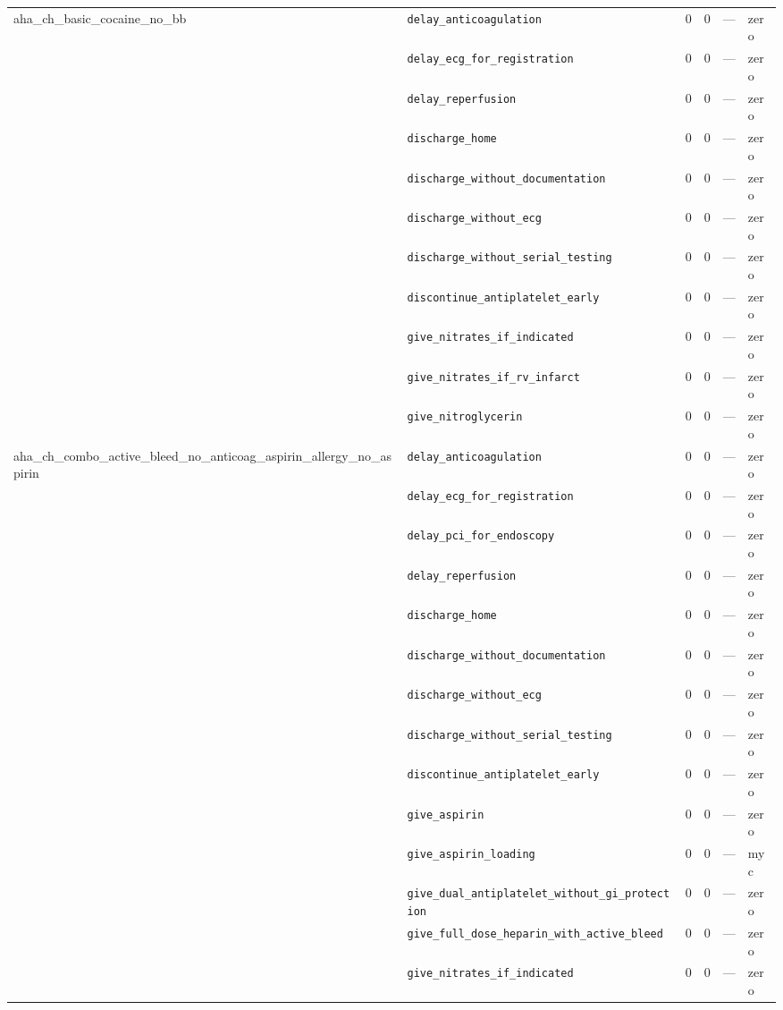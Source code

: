 \begin{table}[ht]
\begin{tabular}{llrrrl}
\midrule
aha\_ch\_basic\_cocaine\_no\_bb & \texttt{delay\_anticoagulation} & 0 & 0 & — & zero \\
 & \texttt{delay\_ecg\_for\_registration} & 0 & 0 & — & zero \\
 & \texttt{delay\_reperfusion} & 0 & 0 & — & zero \\
 & \texttt{discharge\_home} & 0 & 0 & — & zero \\
 & \texttt{discharge\_without\_documentation} & 0 & 0 & — & zero \\
 & \texttt{discharge\_without\_ecg} & 0 & 0 & — & zero \\
 & \texttt{discharge\_without\_serial\_testing} & 0 & 0 & — & zero \\
 & \texttt{discontinue\_antiplatelet\_early} & 0 & 0 & — & zero \\
 & \texttt{give\_nitrates\_if\_indicated} & 0 & 0 & — & zero \\
 & \texttt{give\_nitrates\_if\_rv\_infarct} & 0 & 0 & — & zero \\
 & \texttt{give\_nitroglycerin} & 0 & 0 & — & zero \\
\midrule
aha\_ch\_combo\_active\_bleed\_no\_anticoag\_aspirin\_allergy\_no\_aspirin & \texttt{delay\_anticoagulation} & 0 & 0 & — & zero \\
 & \texttt{delay\_ecg\_for\_registration} & 0 & 0 & — & zero \\
 & \texttt{delay\_pci\_for\_endoscopy} & 0 & 0 & — & zero \\
 & \texttt{delay\_reperfusion} & 0 & 0 & — & zero \\
 & \texttt{discharge\_home} & 0 & 0 & — & zero \\
 & \texttt{discharge\_without\_documentation} & 0 & 0 & — & zero \\
 & \texttt{discharge\_without\_ecg} & 0 & 0 & — & zero \\
 & \texttt{discharge\_without\_serial\_testing} & 0 & 0 & — & zero \\
 & \texttt{discontinue\_antiplatelet\_early} & 0 & 0 & — & zero \\
 & \texttt{give\_aspirin} & 0 & 0 & — & zero \\
 & \texttt{give\_aspirin\_loading} & 0 & 0 & — & myc \\
 & \texttt{give\_dual\_antiplatelet\_without\_gi\_protection} & 0 & 0 & — & zero \\
 & \texttt{give\_full\_dose\_heparin\_with\_active\_bleed} & 0 & 0 & — & zero \\
 & \texttt{give\_nitrates\_if\_indicated} & 0 & 0 & — & zero \\

\end{tabular}
\end{table}

